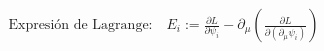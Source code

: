 \documentclass[preview]{standalone}
\begin{document}
\begin{align*}
\text{Expresión de Lagrange:} \quad E_i :=\frac{\partial L}{\partial\psi_i}-\partial_{\mu}\left( \frac{\partial L}{\partial(\partial_{\mu}\psi_i)}\right)
\end{align*}
\end{document}
